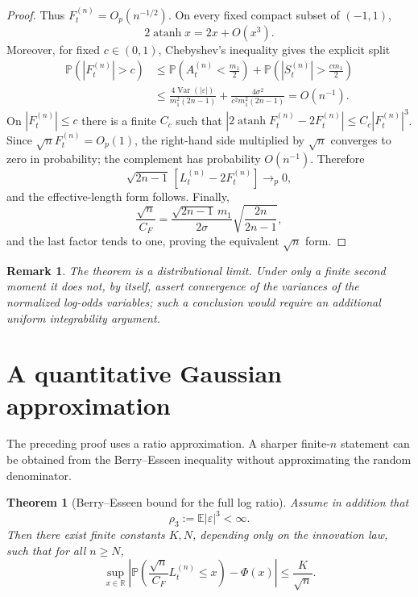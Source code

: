 \documentclass[11pt]{article}
\newtheorem{theorem}{Theorem}
\newtheorem{remark}{Remark}
\newcommand{\E}{\mathbb E}
\newcommand{\Var}{\operatorname{Var}}
\newcommand{\Prob}{\mathbb P}
\newcommand{\atanh}{\operatorname{atanh}}
\begin{document}
\begin{proof}
Thus $F_t^{(n)}=O_p(n^{-1/2})$. On every fixed compact subset of $(-1,1)$,
\begin{equation}
2\atanh x=2x+O(x^3).
\end{equation}
Moreover, for fixed $c\in(0,1)$, Chebyshev's inequality gives the explicit
split
\begin{align}
\Prob(|F_t^{(n)}|>c)
&\le
\Prob\!\left(A_t^{(n)}<\frac{m_1}{2}\right)
+\Prob\!\left(|S_t^{(n)}|>\frac{cm_1}{2}\right)\\
&\le
\frac{4\Var(|\varepsilon|)}{m_1^2(2n-1)}
+\frac{4\sigma^2}{c^2m_1^2(2n-1)}
=O(n^{-1}).
\end{align}
On $|F_t^{(n)}|\le c$ there is a finite $C_c$ such that
$|2\atanh F_t^{(n)}-2F_t^{(n)}|\le C_c|F_t^{(n)}|^3$.
Since $\sqrt nF_t^{(n)}=O_p(1)$, the right-hand side multiplied by $\sqrt n$
converges to zero in probability; the complement has probability $O(n^{-1})$.
Therefore
\begin{equation}
\sqrt{2n-1}\,[L_t^{(n)}-2F_t^{(n)}]\to_p0,
\end{equation}
and the effective-length form follows.  Finally,
\[
\frac{\sqrt n}{C_F}
=\frac{\sqrt{2n-1}\,m_1}{2\sigma}
\sqrt{\frac{2n}{2n-1}},
\]
and the last factor tends to one, proving the equivalent $\sqrt n$ form.
\end{proof}

\begin{remark}
The theorem is a distributional limit.  Under only a finite second moment it
does not, by itself, assert convergence of the variances of the normalized
log-odds variables; such a conclusion would require an additional uniform
integrability argument.
\end{remark}

\section{A quantitative Gaussian approximation}
The preceding proof uses a ratio approximation. A sharper finite-$n$ statement
can be obtained from the Berry--Esseen inequality \cite{berry,esseen} without
approximating the random denominator.

\begin{theorem}[Berry--Esseen bound for the full log ratio]
Assume in addition that
\begin{equation}
\rho_3:=\E|\varepsilon|^3<\infty.
\end{equation}
Then there exist finite constants $K,N$, depending only on the innovation law, such that for all $n\ge N$,
\begin{equation}
\boxed{
\sup_{x\in\mathbb R}
\left|
\Prob\!\left(\frac{\sqrt n}{C_F}L_t^{(n)}\le x\right)-\Phi(x)
\right|
\le\frac{K}{\sqrt n}.}
\end{equation}
\end{theorem}
\end{document}
